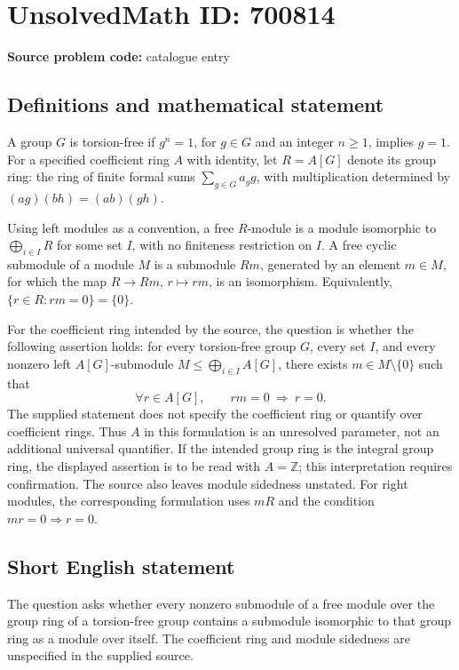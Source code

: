 \documentclass[11pt]{article}
\newcommand{\Z}{\mathbb{Z}}
\begin{document}
\section*{UnsolvedMath ID: 700814}
\textbf{Source problem code:} catalogue entry
\subsection{Definitions and mathematical statement}
A group \(G\) is torsion-free if \(g^n=1\), for \(g\in G\) and an integer \(n\geq 1\), implies \(g=1\). For a specified coefficient ring \(A\) with identity, let \(R=A[G]\) denote its group ring: the ring of finite formal sums \(\sum_{g\in G}a_g g\), with multiplication determined by \((ag)(bh)=(ab)(gh)\).

Using left modules as a convention, a free \(R\)-module is a module isomorphic to \(\bigoplus_{i\in I}R\) for some set \(I\), with no finiteness restriction on \(I\). A free cyclic submodule of a module \(M\) is a submodule \(Rm\), generated by an element \(m\in M\), for which the map \(R\to Rm\), \(r\mapsto rm\), is an isomorphism. Equivalently, \(\{r\in R:rm=0\}=\{0\}\).

For the coefficient ring intended by the source, the question is whether the following assertion holds: for every torsion-free group \(G\), every set \(I\), and every nonzero left \(A[G]\)-submodule \(M\leq\bigoplus_{i\in I}A[G]\), there exists \(m\in M\setminus\{0\}\) such that
\[
\forall r\in A[G],\qquad rm=0\ \Longrightarrow\ r=0.
\]
The supplied statement does not specify the coefficient ring or quantify over coefficient rings. Thus \(A\) in this formulation is an unresolved parameter, not an additional universal quantifier. If the intended group ring is the integral group ring, the displayed assertion is to be read with \(A=\Z\); this interpretation requires confirmation. The source also leaves module sidedness unstated. For right modules, the corresponding formulation uses \(mR\) and the condition \(mr=0\Longrightarrow r=0\).
\subsection{Short English statement}
The question asks whether every nonzero submodule of a free module over the group ring of a torsion-free group contains a submodule isomorphic to that group ring as a module over itself. The coefficient ring and module sidedness are unspecified in the supplied source.
\end{document}
